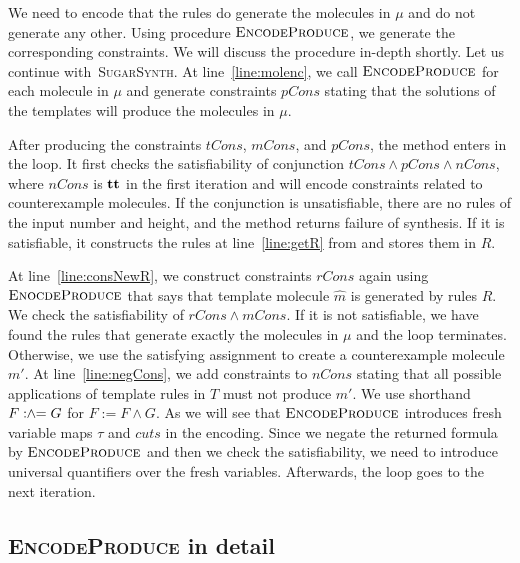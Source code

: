 We need to encode that the rules do generate the molecules
in $\mu$ and do not generate any other.
Using procedure $\textsc{EncodeProduce}$, we generate
the corresponding constraints.
We will discuss the procedure in-depth shortly.
Let us continue with~\textsc{SugarSynth}.
At line~\ref{line:molenc}, we call $\textsc{EncodeProduce}$ for
each molecule in $\mu$ and generate constraints $pCons$ stating that
the solutions of the templates will produce the molecules in $\mu$.

After producing the constraints $tCons$, $mCons$, and $pCons$,
the method enters in the loop.
It first checks the satisfiability of conjunction
$tCons \land pCons \land nCons$, where $nCons$ is $\mathbf{tt}$ in the first iteration
and will encode constraints related to counterexample molecules.
If the conjunction is unsatisfiable, there are no rules of
the input number and height,
and the method returns failure of synthesis.
If it is satisfiable, it constructs the rules at line~\ref{line:getR} from
and stores them in $R$.

At line~\ref{line:consNewR}, we construct constraints $rCons$ again using
$\textsc{EnocdeProduce}$ that says that template molecule $\hat{m}$
is generated by rules $R$.
We check the satisfiability of $rCons \land mCons$.
If it is not satisfiable, we have found the rules that generate exactly
the molecules in $\mu$ and the loop terminates.
Otherwise, we use the satisfying assignment to create a
counterexample molecule $m'$.
At line~\ref{line:negCons}, we add constraints to $nCons$ stating that
all possible applications of template rules in $T$ must not produce $m'$.
We use shorthand $F \mathrel{:\hspace{-3pt}\land\hspace{-3pt}=} G$ for $ F := F \land G$.
As we will see that $\textsc{EncodeProduce}$ introduces fresh variable
maps $\tau$ and $cuts$ in the encoding.
Since we negate the returned formula by $\textsc{EncodeProduce}$ 
and then we check the satisfiability,
we need to introduce universal quantifiers over the
fresh variables. %
Afterwards, the loop goes to the next iteration.



\subsection{\textsc{EncodeProduce} in detail}


